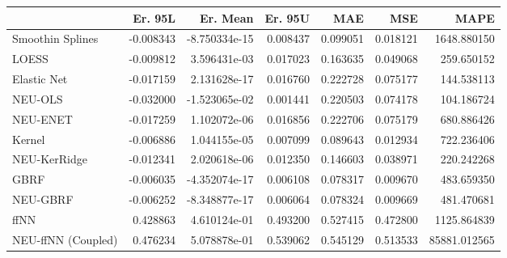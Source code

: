 \begin{tabular}{lrrrrrr}
\toprule
{} &   Er. 95L &      Er. Mean &   Er. 95U &       MAE &       MSE &          MAPE \\
\midrule
Smoothin Splines   & -0.008343 & -8.750334e-15 &  0.008437 &  0.099051 &  0.018121 &   1648.880150 \\
LOESS              & -0.009812 &  3.596431e-03 &  0.017023 &  0.163635 &  0.049068 &    259.650152 \\
Elastic Net        & -0.017159 &  2.131628e-17 &  0.016760 &  0.222728 &  0.075177 &    144.538113 \\
NEU-OLS            & -0.032000 & -1.523065e-02 &  0.001441 &  0.220503 &  0.074178 &    104.186724 \\
NEU-ENET           & -0.017259 &  1.102072e-06 &  0.016856 &  0.222706 &  0.075179 &    680.886426 \\
Kernel             & -0.006886 &  1.044155e-05 &  0.007099 &  0.089643 &  0.012934 &    722.236406 \\
NEU-KerRidge       & -0.012341 &  2.020618e-06 &  0.012350 &  0.146603 &  0.038971 &    220.242268 \\
GBRF               & -0.006035 & -4.352074e-17 &  0.006108 &  0.078317 &  0.009670 &    483.659350 \\
NEU-GBRF           & -0.006252 & -8.348877e-17 &  0.006064 &  0.078324 &  0.009669 &    481.470681 \\
ffNN               &  0.428863 &  4.610124e-01 &  0.493200 &  0.527415 &  0.472800 &   1125.864839 \\
NEU-ffNN (Coupled) &  0.476234 &  5.078878e-01 &  0.539062 &  0.545129 &  0.513533 &  85881.012565 \\
\bottomrule
\end{tabular}
